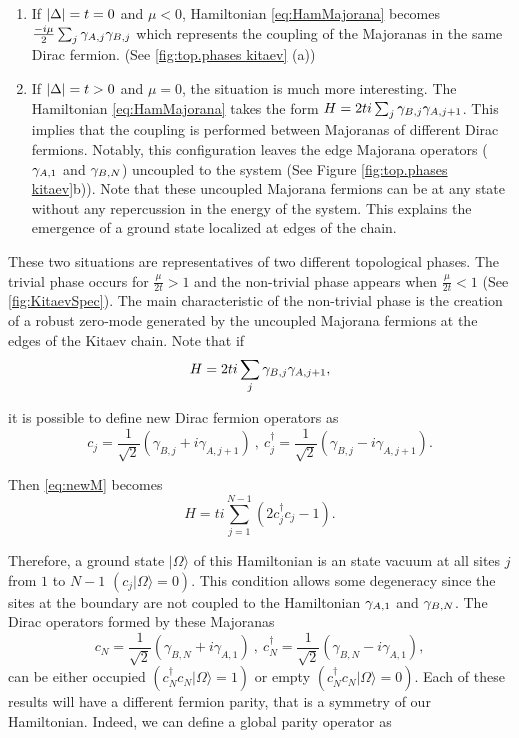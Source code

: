 \begin{enumerate}

  \item If $\vert \Delta \vert = t = 0$ and $\mu <0$, Hamiltonian \eqref{eq:HamMajorana} becomes $\frac{-i\mu}{2} \sum_{j} \gamma_{A,j}\gamma_{B,j}$ which represents the coupling of the Majoranas in the same Dirac fermion. (See \ref{fig:top.phases kitaev} (a))

  \item If $\vert \Delta \vert = t > 0$ and $\mu =0$, the situation is much more interesting. The Hamiltonian \eqref{eq:HamMajorana} takes the form $H = 2ti\sum_{j}  \gamma_{B,j}\gamma_{A,j+1} $. This implies that the coupling is performed between  Majoranas of different Dirac fermions. Notably, this configuration leaves the edge Majorana operators ($\gamma_{A,1}$ and $\gamma_{B,N}$) uncoupled to the system (See Figure \ref{fig:top.phases kitaev}b)). Note that these uncoupled Majorana fermions can be at any state without any  repercussion in the energy of the system. This explains the emergence of a  ground state localized at edges of the chain. 
\end{enumerate}

These two situations are representatives of two different topological phases. The trivial phase occurs for $\frac{\mu}{2t}>1$ and the non-trivial phase appears when $\frac{\mu}{2t}<1$ (See \ref{fig:KitaevSpec}). The main characteristic of the non-trivial phase  is the creation of a robust zero-mode generated by the  uncoupled Majorana fermions at the edges of the Kitaev chain. Note that if
\begin{equation}
H = 2ti\sum_{j}  \gamma_{B,j}\gamma_{A,j+1}, \label{eq:newM} 
\end{equation}
  
\noindent it is possible to define new Dirac fermion operators as 
$$c_j = \frac{1}{\sqrt{2}} \left( \gamma_{B,j}+ i\gamma_{A,j+1} \right) \ , \ c^\dagger_j = \frac{1}{\sqrt{2}} \left( \gamma_{B,j}- i\gamma_{A,j+1} \right). $$

\noindent Then \eqref{eq:newM} becomes 
\begin{equation}
H = ti\sum_{j=1}^{N-1} \left(  2c^\dagger_jc_j-1 \right). \label{eq:newM} 
\end{equation}

Therefore, a ground state $\vert \Omega \rangle$ of this Hamiltonian is an state vacuum at all sites $j$ from $1$ to $N-1$ $(c_j\vert \Omega \rangle = 0)$. This condition allows some degeneracy since the sites at the boundary are not coupled to the Hamiltonian $\gamma_{A,1}$ and $\gamma_{B,N}$. The Dirac  operators formed by these Majoranas 
$$c_N = \frac{1}{\sqrt{2}} \left( \gamma_{B,N}+ i\gamma_{A,1} \right) \ , \ c^\dagger_N = \frac{1}{\sqrt{2}} \left( \gamma_{B,N}- i\gamma_{A,1} \right), $$ 
can be either occupied $(c^\dagger_N c_N \vert \Omega \rangle = 1)$ or empty $(c^\dagger_N c_N \vert \Omega \rangle = 0)$. Each of these results will have a different fermion parity, that is a  symmetry of our Hamiltonian.   Indeed, we can define a global parity operator as 

